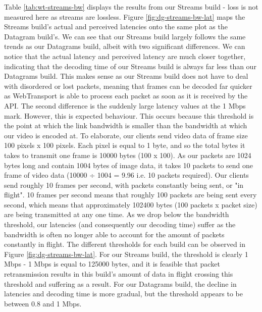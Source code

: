 Table \ref{tab:wt-streams-bw} displays the results from our Streams build - loss is not measured here as streams are lossless. Figure \ref{fig:dg-streams-bw-lat} maps the Streams build's actual and perceived latencies onto the same plot as the Datagram build's. We can see that our Streams build largely follows the same trends as our Datagrams build, albeit with two significant differences. We can notice that the actual latency and perceived latency are much closer together, indicating that the decoding time of our Streams build is always far less than our Datagrams build. This makes sense as our Streams build does not have to deal with disordered or lost packets, meaning that frames can be decoded far quicker as WebTransport is able to process each packet as soon as it is received by the API. The second difference is the suddenly large latency values at the 1 Mbps mark. However, this is expected behaviour. This occurs because this threshold is the point at which the link bandwidth is smaller than the bandwidth at which our video is encoded at. To elaborate, our clients send video data of frame size 100 pixels x 100 pixels. Each pixel is equal to 1 byte, and so the total bytes it takes to transmit one frame is 10000 bytes (100 x 100). As our packets are 1024 bytes long and contain 1004 bytes of image data, it takes 10 packets to send one frame of video data (10000 ÷ 1004 = 9.96 i.e. 10 packets required). Our clients send roughly 10 frames per second, with packets constantly being sent, or "in flight". 10 frames per second means that roughly 100 packets are being sent every second, which means that approximately 102400 bytes (100 packets x packet size) are being transmitted at any one time. As we drop below the bandwidth threshold, our latencies (and consequently our decoding time) suffer as the bandwidth is often no longer able to account for the amount of packets constantly in flight.
The different thresholds for each build can be observed in Figure \ref{fig:dg-streams-bw-lat}. For our Streams build, the threshold is clearly 1 Mbps - 1 Mbps is equal to 125000 bytes, and it is feasible that packet retransmission results in this build's amount of data in flight crossing this threshold and suffering as a result. For our Datagrams build, the decline in latencies and decoding time is more gradual, but the threshold appears to be between 0.8 and 1 Mbps.

